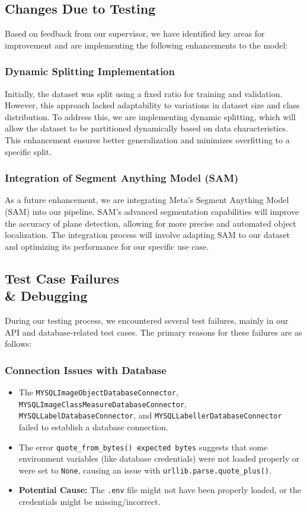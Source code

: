 \documentclass[12pt, titlepage]{article}
\begin{document}
\subsection{Changes Due to Testing}
Based on feedback from our supervisor, we have identified key areas for improvement and are implementing the following enhancements to the model:

\subsubsection{Dynamic Splitting Implementation}
Initially, the dataset was split using a fixed ratio for training and validation. However, this approach lacked adaptability to variations in dataset size and class distribution. To address this, we are implementing dynamic splitting, which will allow the dataset to be partitioned dynamically based on data characteristics. This enhancement ensures better generalization and minimizes overfitting to a specific split.

\subsubsection{Integration of Segment Anything Model (SAM)}
As a future enhancement, we are integrating Meta’s Segment Anything Model (SAM) into our pipeline. SAM's advanced segmentation capabilities will improve the accuracy of plane detection, allowing for more precise and automated object localization. The integration process will involve adapting SAM to our dataset and optimizing its performance for our specific use case.

\subsection{Test Case Failures \\& Debugging}
During our testing process, we encountered several test failures, mainly in our API and database-related test cases. The primary reasons for these failures are as follows:

\subsubsection{Connection Issues with Database}
\begin{itemize}
    \item The \texttt{MYSQLImageObjectDatabaseConnector}, \texttt{MYSQLImageClassMeasureDatabaseConnector}, \texttt{MYSQLLabelDatabaseConnector}, and \texttt{MYSQLLabellerDatabaseConnector} failed to establish a database connection.
    \item The error \texttt{quote\_from\_bytes() expected bytes} suggests that some environment variables (like database credentials) were not loaded properly or were set to \texttt{None}, causing an issue with \texttt{urllib.parse.quote\_plus()}.
    \item \textbf{Potential Cause:} The \texttt{.env} file might not have been properly loaded, or the credentials might be missing/incorrect.
\end{itemize}
\end{document}
